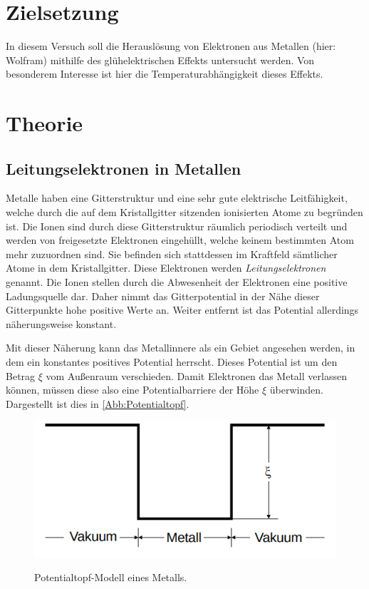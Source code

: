 \section{Zielsetzung}
\label{sec:Zielsetzung}

In diesem Versuch soll die Herauslösung von Elektronen aus Metallen (hier: Wolfram)
mithilfe des glühelektrischen Effekts untersucht werden. Von besonderem Interesse
ist hier die Temperaturabhängigkeit dieses Effekts.

\section{Theorie}
\label{sec:Theorie}

\subsection{Leitungselektronen in Metallen}

Metalle haben eine Gitterstruktur und eine sehr gute 
elektrische Leitfähigkeit, welche durch die auf dem 
Kristallgitter sitzenden ionisierten Atome zu begründen
ist.
Die Ionen sind durch diese Gitterstruktur räumlich
periodisch verteilt und werden von freigesetzte Elektronen
eingehüllt, welche keinem bestimmten Atom mehr zuzuordnen
sind. Sie befinden sich stattdessen im Kraftfeld sämtlicher
Atome in dem Kristallgitter.
Diese Elektronen werden \textit{Leitungselektronen} genannt.
Die Ionen stellen durch die Abwesenheit der Elektronen
eine positive Ladungsquelle dar. Daher nimmt das Gitterpotential
in der Nähe dieser Gitterpunkte hohe positive Werte an.
Weiter entfernt ist das Potential allerdings näherungsweise
konstant.

Mit dieser Näherung kann das Metallinnere als ein Gebiet
angesehen werden, in dem ein konstantes positives Potential
herrscht. Dieses Potential ist um den Betrag $\xi$
vom Außenraum verschieden. Damit Elektronen das Metall
verlassen können, müssen diese also eine Potentialbarriere
der Höhe $\xi$ überwinden. Dargestellt ist dies 
in \autoref{Abb:Potentialtopf}.\\

\begin{figure}[H]
    \centering  
    \caption{Potentialtopf-Modell eines Metalls.\cite{sample}}
    \includegraphics[width=\textwidth]{Bilder/Potentialtopf.png}
    \label{Abb:Potentialtopf}
\end{figure}


